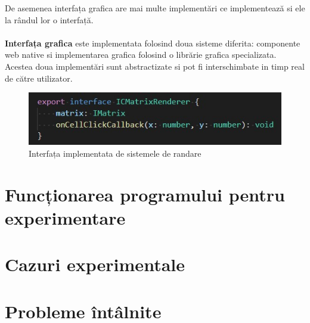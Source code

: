 \documentclass[11pt ,A4]{article}
\begin{document}
                De asemenea interfața grafica are mai multe implementări ce implementează si ele la rândul lor o interfață.



            \paragraph{}
                \textbf{Interfața grafica} este implementata folosind doua sisteme diferita: componente web native si implementarea grafica folosind o librărie grafica specializata.
                Acestea doua implementări sunt abstractizate si pot fi interschimbate  in timp real de către utilizator.
                \begin{figure}[h]
                    \centering
                    \includegraphics[scale=0.8]{ICMatricRenderer_interface}
                    \caption{Interfața implementata de sistemele de randare}
                \end{figure}

    \section{Funcționarea programului pentru experimentare}

        

    \section{Cazuri experimentale}

    \section{Probleme întâlnite}
\end{document}
